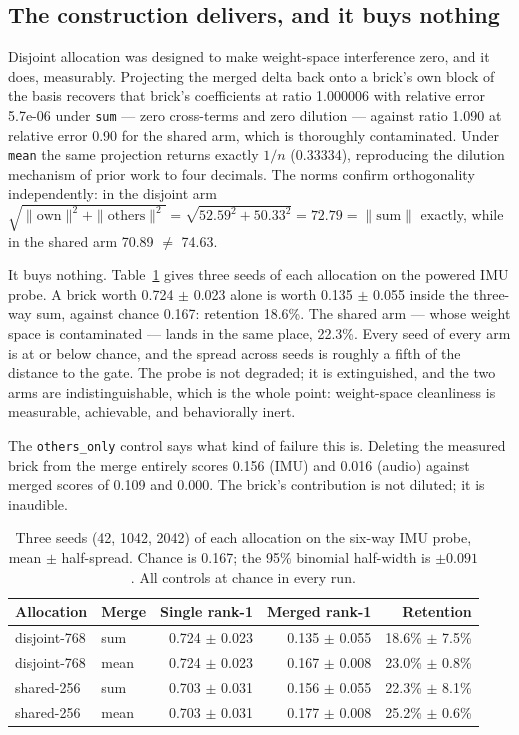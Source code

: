 \documentclass[11pt]{article}
\begin{document}
\subsection{The construction delivers, and it buys nothing}
Disjoint allocation was designed to make weight-space interference zero, and it does, measurably. Projecting the merged delta back onto a brick's own block of the basis recovers that brick's coefficients at ratio 1.000006 with relative error 5.7e-06 under \texttt{sum} --- zero cross-terms and zero dilution --- against ratio 1.090 at relative error 0.90 for the shared arm, which is thoroughly contaminated. Under \texttt{mean} the same projection returns exactly $1/n$ (0.33334), reproducing the dilution mechanism of prior work to four decimals. The norms confirm orthogonality independently: in the disjoint arm $\sqrt{\|{\mathrm{own}}\|^2 + \|{\mathrm{others}}\|^2} = \sqrt{52.59^2 + 50.33^2} = 72.79 = \|{\mathrm{sum}}\|$ exactly, while in the shared arm 70.89 $\ne$ 74.63.

It buys nothing. Table~\ref{tab:seeds} gives three seeds of each allocation on the powered IMU probe. A brick worth 0.724 $\pm$ 0.023 alone is worth 0.135 $\pm$ 0.055 inside the three-way sum, against chance 0.167: retention 18.6\%. The shared arm --- whose weight space is contaminated --- lands in the same place, 22.3\%. Every seed of every arm is at or below chance, and the spread across seeds is roughly a fifth of the distance to the gate. The probe is not degraded; it is extinguished, and the two arms are indistinguishable, which is the whole point: weight-space cleanliness is measurable, achievable, and behaviorally inert.

The \texttt{others\_only} control says what kind of failure this is. Deleting the measured brick from the merge entirely scores 0.156 (IMU) and 0.016 (audio) against merged scores of 0.109 and 0.000. The brick's contribution is not diluted; it is inaudible.

\begin{table}[t]
\centering
\caption{Three seeds (42, 1042, 2042) of each allocation on the six-way IMU probe, mean $\pm$ half-spread. Chance is 0.167; the 95\% binomial half-width is $\pm0.091$. All controls at chance in every run.}
\label{tab:seeds}
\begin{tabular}{llrrr}
\toprule
Allocation & Merge & Single rank-1 & Merged rank-1 & Retention \\
\midrule
disjoint-768 & sum & 0.724 $\pm$ 0.023 & 0.135 $\pm$ 0.055 & 18.6\% $\pm$ 7.5\% \\
disjoint-768 & mean & 0.724 $\pm$ 0.023 & 0.167 $\pm$ 0.008 & 23.0\% $\pm$ 0.8\% \\
shared-256 & sum & 0.703 $\pm$ 0.031 & 0.156 $\pm$ 0.055 & 22.3\% $\pm$ 8.1\% \\
shared-256 & mean & 0.703 $\pm$ 0.031 & 0.177 $\pm$ 0.008 & 25.2\% $\pm$ 0.6\% \\
\bottomrule
\end{tabular}
\end{table}
\end{document}
